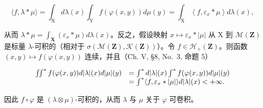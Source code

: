 \[
\langle f, \lambda * \mu \rangle = \int_ {\mathrm{X}} d \lambda (x) \int_ {\mathrm{Y}} f (\varphi (x, y)) d \mu (y) = \int_ {\mathrm{X}} \left\langle f, \varepsilon_ {x} * \mu \right\rangle d \lambda (x),
\]

从而 \(\lambda * \mu = \int_{\mathbf{X}} (\varepsilon_x * \mu) d\lambda(x)\)。反之，假设映射 \(x \mapsto \varepsilon_x * |\mu|\) 从 X 到 \(\mathcal{M}(\mathbf{Z})\) 是标量 \(\lambda\)-可积的（相对于 \(\sigma(\mathcal{M}(\mathbf{Z}), \mathcal{K}(\mathbf{Z}))\)）。令 \(f \in \mathcal{H}_+(\mathbf{Z})\)。则函数 \((x,y) \mapsto f(\varphi(x,y))\) 连续，并且（Ch. V, §8, No.~3, 命题 5）

\[
\begin{array}{r l} \iint^ {*} f (\varphi (x, y)) d | \lambda | (x) d | \mu | (y) & = \int^ {*} d | \lambda | (x) \int^ {*} f (\varphi (x, y)) d | \mu | (y) \\ & = \int^ {*} \langle f, \varepsilon_ {x} * | \mu | \rangle d | \lambda | (x) <   + \infty . \end{array}
\]

因此 \(f \circ \varphi\) 是 \((\lambda \otimes \mu)\)-可积的，从而 \(\lambda\) 与 \(\mu\) 关于 \(\varphi\) 可卷积。

